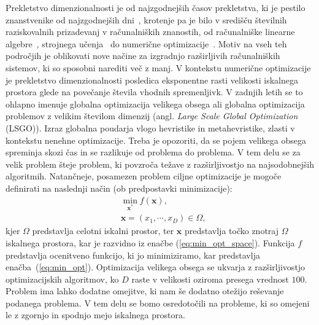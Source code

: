Prekletstvo dimenzionalnosti je od najzgodnejših časov prekletstva, ki je pestilo znanstvenike od najzgodnejših dni~\cite{bib:curse_of_dim}, krotenje pa je bilo v središču številnih raziskovalnih prizadevanj v računalniških znanostih, od računalniške linearne algebre~\cite{bib:COD:linear_algebra}, strojnega učenja~\cite{bib:COD:machine_learning} do numerične optimizacije~\cite{bib:COD:numerical_methods}.
Motiv na vseh teh področjih je oblikovati nove načine za izgradnjo razširljivih računalniških sistemov, ki so sposobni narediti več z manj.
V kontekstu numerične optimizacije je prekletstvo dimenzionalnosti posledica eksponentne rasti velikosti iskalnega prostora glede na povečanje števila vhodnih spremenljivk.
V zadnjih letih se to ohlapno imenuje globalna optimizacija velikega obsega ali globalna optimizacija problemov z velikim številom dimenzij (angl. \textit{Large Scale Global Optimization} (LSGO)).
Izraz globalna poudarja vlogo hevristike in metahevristike, zlasti v kontekstu nenehne optimizacije.
Treba je opozoriti, da se pojem velikega obsega spreminja skozi čas in se razlikuje od problema do problema.
V tem delu se za velik problem šteje problem, ki povzroča težave z razširljivostjo na najsodobnejših algoritmih.
Natančneje, posamezen problem ciljne optimizacije je mogoče definirati na naslednji način (ob predpostavki minimizacije):
\begin{align}
	&\min_{\mathbf{x}^*}{f(\mathbf{x})}, \label{eq:min_opt}\\
	&\mathbf{x} = (x_1, \cdots, x_D) \in \Omega \label{eq:min_opt_space},
\end{align}
kjer $\Omega$ predstavlja celotni iskalni prostor, ter $\mathbf{x}$ predstavlja točko znotraj $\Omega$ iskalnega prostora, kar je razvidno iz enačbe (\ref{eq:min_opt_space}).
Funkcija $f$ predstavlja ocenitveno funkcijo, ki jo minimiziramo, kar predstavlja enačba~(\ref{eq:min_opt}).
Optimizacija velikega obsega se ukvarja z razširljivostjo optimizacijskih algoritmov, ko $D$ raste v velikosti oziroma presega vrednost $100$.
Problem ima lahko dodatne omejitve, ki nam še dodatno otežijo reševanje podanega problema.
V tem delu se bomo osredotočili na probleme, ki so omejeni le z zgornjo in spodnjo mejo iskalnega prostora.

